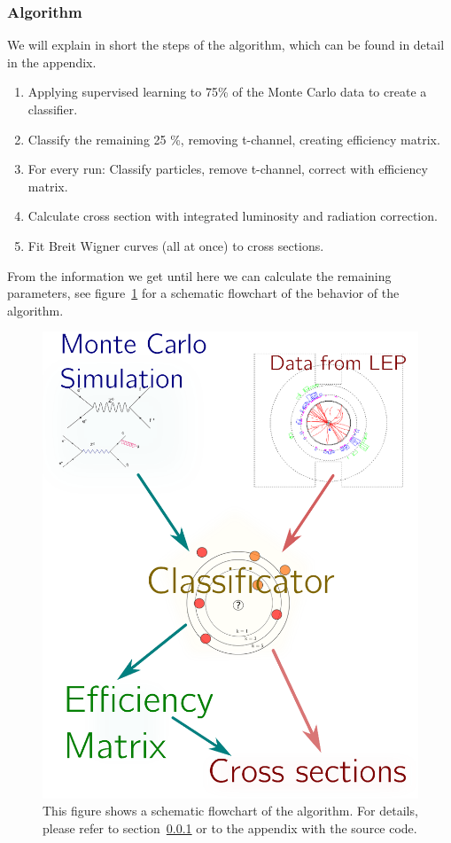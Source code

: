 \subsubsection{Algorithm}
\label{sec:algo}
We will explain in short the steps of the algorithm, which can be found in detail in the appendix.
\begin{enumerate}
    \item Applying supervised learning to 75\% of the Monte Carlo data to create a classifier.
    \item Classify the remaining 25 \%, removing t-channel, creating efficiency matrix.
    \item For every run: Classify particles, remove t-channel, correct with efficiency matrix.
    \item Calculate cross section with integrated luminosity and radiation correction. 
    \item Fit Breit Wigner curves (all at once) to cross sections.  
\end{enumerate}
From the information we get until here we can calculate the remaining parameters, see figure~\ref{fig:algorithm} for 
a schematic flowchart of the behavior of the algorithm.
\begin{figure}[htpb]
    \centering
    \includegraphics[width=0.5\linewidth]{figures/algorithm}
    \caption{This figure shows a schematic flowchart of the algorithm. For details, please refer to section~\ref{sec:algo} or
    to the appendix with the source code.}
\label{fig:algorithm}
\end{figure}


\clearpage
